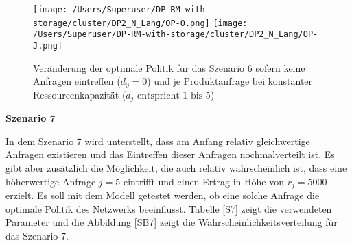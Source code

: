 \begin{figure}[h!]     
\begin{center}
\texttt{[image: /Users/Superuser/DP-RM-with-storage/cluster/DP2\_N\_Lang/OP-0.png]}
\texttt{[image: /Users/Superuser/DP-RM-with-storage/cluster/DP2\_N\_Lang/OP-J.png]}
    \caption{Veränderung der optimale Politik für das Szenario 6 sofern keine Anfragen eintreffen ($d_0=0$) und je Produktanfrage bei konstanter Ressourcenkapazität ($d_j\text{ entspricht }1\text{ bis }5$)}  \label{SV6}
  \end{center}
\end{figure}

\textbf{Szenario 7}

In dem Szenario 7 wird unterstellt, dass am Anfang relativ gleichwertige Anfragen existieren und das Eintreffen dieser Anfragen nochmalverteilt ist. Es gibt aber zusätzlich die Möglichkeit, die auch relativ wahrscheinlich ist, dass eine höherwertige Anfrage $j=5$ eintrifft und einen Ertrag in Höhe von $r_j=5000$ erzielt. Es soll mit dem Modell getestet werden, ob eine solche Anfrage die optimale Politik des Netzwerks beeinflusst. Tabelle \ref{S7} zeigt die verwendeten Parameter und die Abbildung \ref{SB7} zeigt die Wahrscheinlichkeitsverteilung für das Szenario 7.


